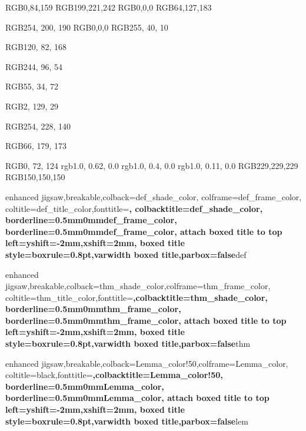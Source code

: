 
\definecolor{def_color}			{RGB}{0,84,159}
\definecolor{def_shade_color}	{RGB}{199,221,242}
\definecolor{def_title_color}	{RGB}{0,0,0}
\definecolor{def_frame_color}	{RGB}{64,127,183}


\definecolor{thm_shade_color}	{RGB}{254, 200, 190}
\definecolor{thm_title_color}	{RGB}{0,0,0}
\definecolor{thm_frame_color}	{RGB}{255, 40, 10}


\definecolor{Corollary_color}   {RGB}{120, 82, 168}

\definecolor{Remark_color}      {RGB}{244, 96, 54}

\definecolor{AltTheorem_color}  {RGB}{55, 34, 72}

\definecolor{Example_color}     {RGB}{2, 129, 29}

\definecolor{Lemma_color}       {RGB}{254, 228, 140}

\definecolor{Proposition_color} {RGB}{66, 179, 173}

\definecolor{indigo_dye}        {RGB}{0, 72, 124}
\definecolor{orangepeel}        {rgb}{1.0, 0.62, 0.0}
\definecolor{blazeorange}       {rgb}{1.0, 0.4, 0.0}
\definecolor{ferrarired}        {rgb}{1.0, 0.11, 0.0}
\definecolor{fouriergray}       {RGB}{229,229,229}
\definecolor{darkfouriergray}       {RGB}{150,150,150}




{enhanced jigsaw,breakable,colback=def_shade_color, colframe=def_frame_color,
coltitle=def_title_color,fonttitle=\bfseries, colbacktitle=def_shade_color,
borderline={0.5mm}{0mm}{def_frame_color},
borderline={0.5mm}{0mm}{def_frame_color},
attach boxed title to top left={yshift=-2mm,xshift=2mm},
boxed title style={boxrule=0.8pt},varwidth boxed title,parbox=false}{def}



{enhanced jigsaw,breakable,colback=thm_shade_color,colframe=thm_frame_color,
coltitle=thm_title_color,fonttitle=\bfseries ,colbacktitle=thm_shade_color,
borderline={0.5mm}{0mm}{thm_frame_color},
borderline={0.5mm}{0mm}{thm_frame_color},
attach boxed title to top left={yshift=-2mm,xshift=2mm},
boxed title style={boxrule=0.8pt},varwidth boxed title,parbox=false}{thm}



{enhanced jigsaw,breakable,colback=Lemma_color!50,colframe=Lemma_color,
coltitle=black,fonttitle=\bfseries ,colbacktitle=Lemma_color!50,
borderline={0.5mm}{0mm}{Lemma_color},
borderline={0.5mm}{0mm}{Lemma_color},
attach boxed title to top left={yshift=-2mm,xshift=2mm},
boxed title style={boxrule=0.8pt},varwidth boxed title,parbox=false}{lem}



